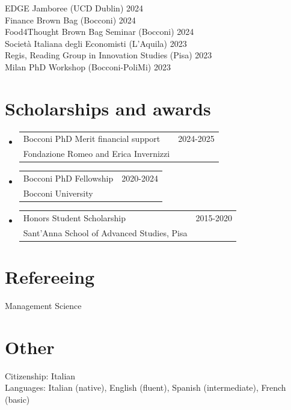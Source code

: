 \documentclass[A4,11pt]{article}
\makeatletter
\newcommand{\CVAw}[4]{
	\vspace{-2pt}\item
	\begin{tabular*}{0.97\textwidth}[t]{l@{\extracolsep{\fill}}r}
		#1 & #2 \\
		\small#3 & \small #4 \\
	\end{tabular*}\vspace{-7pt}
}
\newcommand{\CVSubHeadingListStart}{\begin{itemize}[leftmargin=0.5cm, label={}]}
\newcommand{\CVSubHeadingListEnd}{\end{itemize}}
\makeatother
\begin{document}
\smallskip
\hspace{12pt} EDGE Jamboree (UCD Dublin) \hfill 2024\\
\smallskip
\hspace{12pt} Finance Brown Bag (Bocconi) \hfill 2024\\
\smallskip
\hspace{12pt} Food4Thought Brown Bag Seminar (Bocconi) \hfill 2024\\
\smallskip
\hspace{12pt} Società Italiana degli Economisti (L'Aquila) \hfill 2023\\
\smallskip
\hspace{12pt} Regis, Reading Group in Innovation Studies (Pisa) \hfill 2023\\
\smallskip
\hspace{12pt} Milan PhD Workshop (Bocconi-PoliMi) \hfill 2023\\

\vspace{1pt}

\section{Scholarships and awards}

\CVSubHeadingListStart
\CVAw{Bocconi PhD Merit financial support}{2024-2025}{Fondazione Romeo and Erica Invernizzi}{}
\CVAw{Bocconi PhD Fellowship}{2020-2024}{Bocconi University}{}
\CVAw{Honors Student Scholarship}{2015-2020}{Sant’Anna School of Advanced Studies, Pisa}{}

\CVSubHeadingListEnd


\vspace{1pt}

\section{Refereeing}
\hspace{12pt} Management Science

\vspace{1pt}

\section{Other}
\hspace{12pt} Citizenship: Italian\\
\smallskip
\hspace{12pt} Languages: Italian (native), English (fluent), Spanish (intermediate), French (basic)
    
\end{document}
